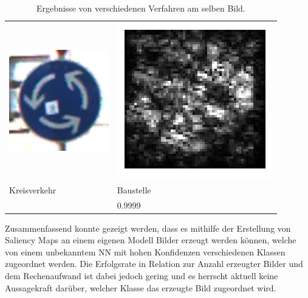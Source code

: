 \begin{table}
\begin{tabular}{p{4.4cm}p{4.4cm}}
		\includegraphics[height=4.4cm]{Images/AnPe/04709} &\includegraphics[width=\linewidth]{Images/AnPe/04709_int_grad}  \\
		Kreisverkehr &Baustelle \\
		& 0.9999
	\end{tabular}
	\caption{Ergebnisse von verschiedenen Verfahren am selben Bild. }
\label{tab:sal2}
\end{table}

Zusammenfassend konnte gezeigt werden, dass es mithilfe der Erstellung von Saliency Maps an einem eigenen Modell Bilder erzeugt werden können, welche von einem unbekanntem NN mit hohen Konfidenzen verschiedenen Klassen zugeordnet werden. Die Erfolgsrate in Relation zur Anzahl erzeugter Bilder und dem Rechenaufwand ist dabei jedoch gering und es herrscht aktuell keine Aussagekraft darüber, welcher Klasse das erzeugte Bild zugeordnet wird. 
